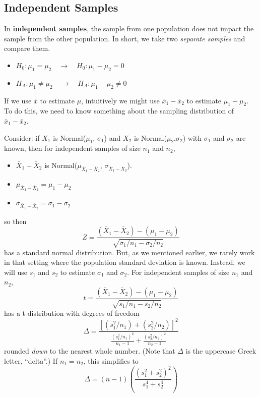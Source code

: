 \documentclass[
]{book}
\providecommand{\tightlist}{%
  \setlength{\itemsep}{0pt}\setlength{\parskip}{0pt}}
\begin{document}
\subsection{Independent Samples}\label{independent-samples}

In \textbf{independent samples}, the sample from one population does not impact the sample from the other population. In short, we take two \emph{separate samples} and compare them.

\begin{itemize}
\tightlist
\item
  \(H_0: \mu_1 = \mu_2 \quad \rightarrow \quad H_0: \mu_1 - \mu_2 = 0\)
\item
  \(H_A: \mu_1 \ne \mu_2 \quad \rightarrow \quad H_A: \mu_1 - \mu_2 \ne 0\)
\end{itemize}

If we use \(\bar{x}\) to estimate \(\mu\), intuitively we might use \(\bar{x}_1-\bar{x}_2\) to estimate \(\mu_1 - \mu_2\). To do this, we need to know something about the sampling distribution of \(\bar{x}_1-\bar{x}_2\).

Consider: if \(X_1\) is Normal(\(\mu_1\), \(\sigma_1\)) and \(X_2\) is Normal(\(\mu_2\),\(\sigma_2\)) with \(\sigma_1\) and \(\sigma_2\) are known, then for independent samples of size \(n_1\) and \(n_2\),

\begin{itemize}
\tightlist
\item
  \(\bar{X}_1-\bar{X}_2\) is Normal(\(\mu_{\bar{X}_1-\bar{X}_2}\), \(\sigma_{\bar{X}_1-\bar{X}_2}\)).
\item
  \(\mu_{\bar{X}_1-\bar{X}_2} = \mu_1 - \mu_2\)
\item
  \(\sigma_{\bar{X}_1-\bar{X}_2} = \sigma_1 - \sigma_2\)
\end{itemize}

so then \[Z = \frac{(\bar{X}_1 - \bar{X}_2) - (\mu_1 - \mu_2)}{\sqrt{\sigma_1/n_1 - \sigma_2/n_2}}\] has a standard normal distribution. But, as we mentioned earlier, we rarely work in that setting where the population standard deviation is known. Instead, we will use \(s_1\) and \(s_2\) to estimate \(\sigma_1\) and \(\sigma_2\). For independent samples of size \(n_1\) and \(n_2\), \[t = \frac{(\bar{X}_1 - \bar{X}_2) - (\mu_1 - \mu_2)}{\sqrt{s_1/n_1 - s_2/n_2}}\] has a t-distribution with degrees of freedom \[\Delta = \frac{[(s_1^2/n_1) + (s_2^2/n_2)]^2}{\frac{(s_1^2/n_1)^2}{n_1-1} + \frac{(s_2^2/n_2)^2}{n_2-1}}\] rounded \emph{down} to the nearest whole number. (Note that \(\Delta\) is the uppercase Greek letter, ``delta''.) If \(n_1 = n_2\), this simplifies to \[\Delta = (n-1)\left(\frac{(s_1^2 + s_2^2)^2}{s_1^4 + s_2^4}\right)\]
\end{document}
